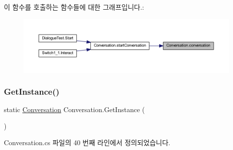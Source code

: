 이 함수를 호출하는 함수들에 대한 그래프입니다.\+:\nopagebreak
\begin{figure}[H]
\begin{center}
\leavevmode
\includegraphics[width=350pt]{d2/d94/class_conversation_a11eb2e1944c3a857ac1447288d89fc39_icgraph}
\end{center}
\end{figure}
\mbox{\label{class_conversation_abdff2391f9a6c8a1ec35a0dc074fb48d}} 
\subsubsection{\texorpdfstring{GetInstance()}{GetInstance()}}
{\footnotesize\ttfamily static \mbox{\hyperlink{class_conversation}{Conversation}} Conversation.\+Get\+Instance (\begin{DoxyParamCaption}{ }\end{DoxyParamCaption})\hspace{0.3cm}{\ttfamily [static]}}



Conversation.\+cs 파일의 40 번째 라인에서 정의되었습니다.



